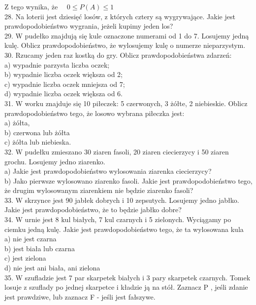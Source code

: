 \documentclass[10pt]{article}
\begin{document}
Z tego wynika, że \(\quad 0 \leqslant P(A) \leqslant 1\)\\
28. Na loterii jest dziesięć losów, z których cztery są wygrywające. Jakie jest prawdopodobieństwo wygrania, jeżeli kupimy jeden los?\\
29. W pudełko znajdują się kule oznaczone numerami od 1 do 7. Losujemy jedną kulę. Oblicz prawdopodobieństwo, że wylosujemy kulę o numerze nieparzystym.\\
30. Rzucamy jeden raz kostką do gry. Oblicz prawdopodobieństwa zdarzeń:\\
a) wypadnie parzysta liczba oczek;\\
b) wypadnie liczba oczek większa od 2;\\
c) wypadnie liczba oczek mniejsza od 7;\\
d) wypadnie liczba oczek większa od 6.\\
31. W worku znajduje się 10 piłeczek: 5 czerwonych, 3 żółte, 2 niebieskie. Oblicz prawdopodobieństwo tego, że losowo wybrana piłeczka jest:\\
a) żółta,\\
b) czerwona lub żółta\\
c) żółta lub niebieska.\\
32. W pudełku zmieszano 30 ziaren fasoli, 20 ziaren ciecierzycy i 50 ziaren grochu. Losujemy jedno ziarenko.\\
a) Jakie jest prawdopodobieństwo wylosowania ziarenka ciecierzycy?\\
b) Jako pierwsze wylosowano ziarenko fasoli. Jakie jest prawdopodobieństwo tego, że drugim wylosowanym ziarenkiem nie będzie ziarenko fasoli?\\
33. W skrzynce jest 90 jabłek dobrych i 10 zepsutych. Losujemy jedno jabłko. Jakie jest prawdopodobieństwo, że to będzie jabłko dobre?\\
34. W urnie jest 8 kul białych, 7 kul czarnych i 5 zielonych. Wyciągamy po ciemku jedną kulę. Jakie jest prawdopodobieństwo tego, że ta wylosowana kula\\
a) nie jest czarna\\
b) jest biała lub czarna\\
c) jest zielona\\
d) nie jest ani biała, ani zielona\\
35. W szufladzie jest 7 par skarpetek białych i 3 pary skarpetek czarnych. Tomek losuje z szuflady po jednej skarpetce i kładzie ją na stół. Zaznacz P , jeśli zdanie jest prawdziwe, lub zaznacz F - jeśli jest fałszywe.\\
\end{document}
